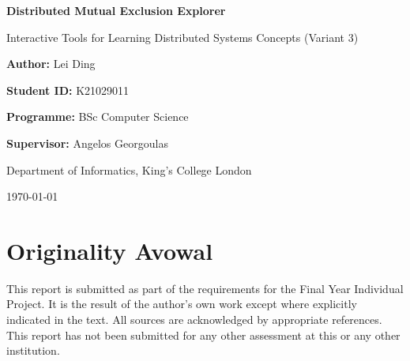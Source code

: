 \documentclass{informatics-report}
\newcommand{\ProjectTitle}{Distributed Mutual Exclusion Explorer}
\newcommand{\ProjectSubtitle}{Interactive Tools for Learning Distributed Systems Concepts (Variant 3)}
\newcommand{\StudentName}{Lei Ding}
\newcommand{\StudentID}{K21029011}
\newcommand{\ProgrammeName}{BSc Computer Science}
\newcommand{\SupervisorName}{Angelos Georgoulas}
\newcommand{\DepartmentName}{Department of Informatics, King's College London}
\begin{document}
\begin{titlepage}
\centering
\vspace*{2.2cm}

{\color{deepblue}\bfseries\LARGE \ProjectTitle\par}
\vspace{0.6cm}
{\Large \ProjectSubtitle\par}

\vspace{2.0cm}

{\large \textbf{Author:} \StudentName\par}
\vspace{0.2cm}
{\large \textbf{Student ID:} \StudentID\par}
\vspace{0.2cm}
{\large \textbf{Programme:} \ProgrammeName\par}

\vspace{1.0cm}

{\large \textbf{Supervisor:} \SupervisorName\par}
\vspace{0.2cm}
{\large \DepartmentName\par}

\vfill

{\large \today\par}
\end{titlepage}


\chapter*{Originality Avowal}
This report is submitted as part of the requirements for the Final Year Individual Project.
It is the result of the author's own work except where explicitly indicated in the text.
All sources are acknowledged by appropriate references.
This report has not been submitted for any other assessment at this or any other institution.
\end{document}
